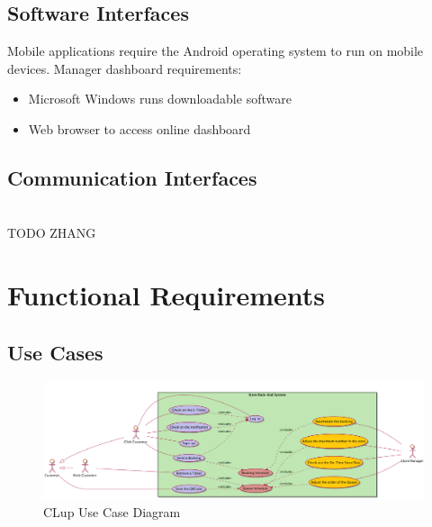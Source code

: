 \documentclass[a4paper,12pt]{report}
\begin{document}
\subsection{Software  Interfaces}
Mobile applications require the Android operating system to run on mobile devices.
Manager dashboard requirements:
\begin{itemize}
	\item Microsoft Windows runs downloadable software
	\item Web browser to access online dashboard
\end{itemize}

\subsection{Communication Interfaces}
\\TODO ZHANG


\section{Functional Requirements}
\subsection{Use Cases}

\begin{figure}
	\includegraphics[angle=90,scale=0.17]{usecase_diagram.png}
	\centering
	\caption{CLup Use Case Diagram}
	\label{Use Case}
\end{figure}
\end{document}
